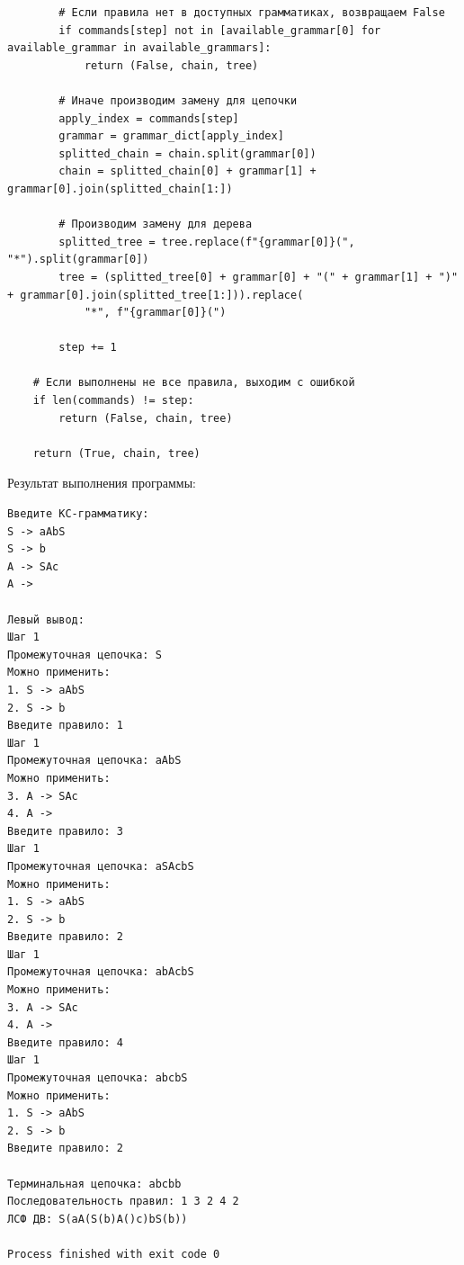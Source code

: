 \documentclass[a4paper,14pt]{extarticle}
\begin{document}
\begin{enumerate}[1.]
\begin{verbatim}
        # Если правила нет в доступных грамматиках, возвращаем False
        if commands[step] not in [available_grammar[0] for available_grammar in available_grammars]:
            return (False, chain, tree)

        # Иначе производим замену для цепочки
        apply_index = commands[step]
        grammar = grammar_dict[apply_index]
        splitted_chain = chain.split(grammar[0])
        chain = splitted_chain[0] + grammar[1] + grammar[0].join(splitted_chain[1:])

        # Производим замену для дерева
        splitted_tree = tree.replace(f"{grammar[0]}(", "*").split(grammar[0])
        tree = (splitted_tree[0] + grammar[0] + "(" + grammar[1] + ")" + grammar[0].join(splitted_tree[1:])).replace(
            "*", f"{grammar[0]}(")

        step += 1

    # Если выполнены не все правила, выходим с ошибкой
    if len(commands) != step:
        return (False, chain, tree)

    return (True, chain, tree)
\end{verbatim}
          Результат выполнения программы:
          \begin{verbatim}
Введите КС-грамматику:
S -> aAbS
S -> b
A -> SAc
A -> 

Левый вывод: 
Шаг 1
Промежуточная цепочка: S
Можно применить:
1. S -> aAbS
2. S -> b
Введите правило: 1
Шаг 1
Промежуточная цепочка: aAbS
Можно применить:
3. A -> SAc
4. A -> 
Введите правило: 3
Шаг 1
Промежуточная цепочка: aSAcbS
Можно применить:
1. S -> aAbS
2. S -> b
Введите правило: 2
Шаг 1
Промежуточная цепочка: abAcbS
Можно применить:
3. A -> SAc
4. A -> 
Введите правило: 4
Шаг 1
Промежуточная цепочка: abcbS
Можно применить:
1. S -> aAbS
2. S -> b
Введите правило: 2

Терминальная цепочка: abcbb
Последовательность правил: 1 3 2 4 2
ЛСФ ДВ: S(aA(S(b)A()c)bS(b))

Process finished with exit code 0
    \end{verbatim}






\end{enumerate}
\end{document}
